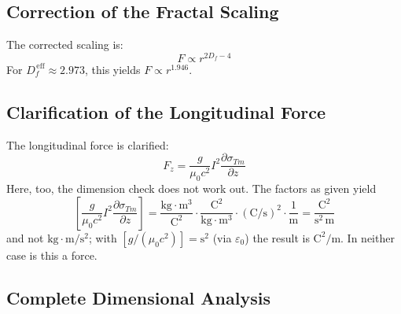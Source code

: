 	\subsection{Correction of the Fractal Scaling}
	The corrected scaling is:
	\begin{equation}
		F \propto r^{2D_f - 4} \label{eq:fractal_scaling_final}
	\end{equation}
	For $D_f^{\,\text{eff}} \approx 2.973$, this yields $F \propto r^{1.946}$.
	
	\subsection{Clarification of the Longitudinal Force}
	The longitudinal force is clarified:
	\begin{equation}
		F_z = \frac{g}{\mu_0 c^2} I^2 \frac{\partial \sigma_{Tm}}{\partial z} \label{eq:long_force_final}
	\end{equation}
	Here, too, the dimension check does not work out. The factors as given yield
	\begin{equation}
		\left[\frac{g}{\mu_0 c^2} I^2 \frac{\partial \sigma_{Tm}}{\partial z}\right] = \frac{\text{kg} \cdot \text{m}^3}{\text{C}^2} \cdot \frac{\text{C}^2}{\text{kg} \cdot \text{m}^3} \cdot (\text{C}/\text{s})^2 \cdot \frac{1}{\text{m}} = \frac{\text{C}^2}{\text{s}^2\,\text{m}}
	\end{equation}
	and not $\text{kg}\cdot\text{m}/\text{s}^2$; with $[g/(\mu_0 c^2)] = \text{s}^2$ (via $\varepsilon_0$) the result is $\text{C}^2/\text{m}$. In neither case is this a force.
	
	\subsection{Complete Dimensional Analysis}
	\begin{table}[h]
		\centering
		\caption{Dimensional definitions in the T0 model}
		\label{tab:dimensions}
	\end{table}
	
